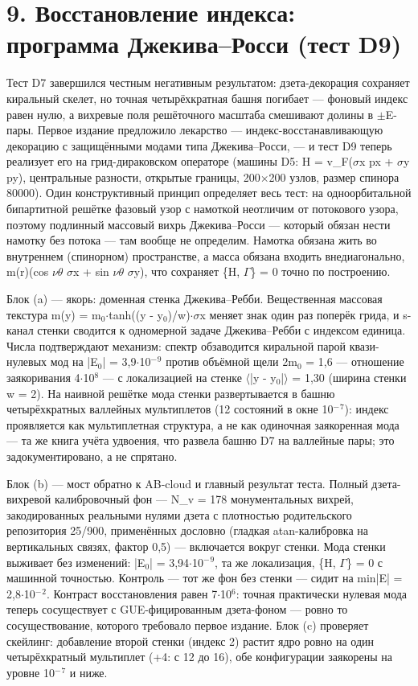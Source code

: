\documentclass[11pt,a4paper]{article}
\begin{document}
\section{9. Восстановление индекса: программа Джекива--Росси (тест D9)}
Тест D7 завершился честным негативным результатом: дзета-декорация сохраняет киральный скелет, но точная четырёхкратная башня погибает --- фоновый индекс равен нулю, а вихревые поля решёточного масштаба смешивают долины в $\pm$E-пары. Первое издание предложило лекарство --- индекс-восстанавливающую декорацию с защищёнными модами типа Джекива--Росси, --- и тест D9 теперь реализует его на грид-дираковском операторе (машины D5: H = v\_\allowbreak{}F($\sigma$x px + $\sigma$y py), центральные разности, открытые границы, 200$\times$200 узлов, размер спинора 80000). Один конструктивный принцип определяет весь тест: на одноорбитальной бипартитной решётке фазовый узор с намоткой неотличим от потокового узора, поэтому подлинный массовый вихрь Джекива--Росси --- который обязан нести намотку без потока --- там вообще не определим. Намотка обязана жить во внутреннем (спинорном) пространстве, а масса обязана входить внедиагонально, m(r)(cos $\nu$$\theta$ $\sigma$x + sin $\nu$$\theta$ $\sigma$y), что сохраняет \{H, $\Gamma$\} = 0 точно по построению.

Блок (a) --- якорь: доменная стенка Джекива--Ребби. Вещественная массовая текстура m(y) = m$_{0}$$\cdot$tanh((y - y$_{0}$)/w)$\cdot$$\sigma$x меняет знак один раз поперёк грида, и s-канал стенки сводится к одномерной задаче Джекива--Ребби с индексом единица. Числа подтверждают механизм: спектр обзаводится киральной парой квази-нулевых мод на |E$_{0}$| = 3,9$\cdot$10$^{-}$$^{9}$ против объёмной щели 2m$_{0}$ = 1,6 --- отношение заякоривания 4$\cdot$10$^{8}$ --- с локализацией на стенке $\langle$|y - y$_{0}$|$\rangle$ = 1,30 (ширина стенки w = 2). На наивной решётке мода стенки развертывается в башню четырёхкратных валлейных мультиплетов (12 состояний в окне 10$^{-}$$^{7}$): индекс проявляется как мультиплетная структура, а не как одиночная заякоренная мода --- та же книга учёта удвоения, что развела башню D7 на валлейные пары; это задокументировано, а не спрятано.

Блок (b) --- мост обратно к AB-cloud и главный результат теста. Полный дзета-вихревой калибровочный фон --- N\_\allowbreak{}v = 178 монументальных вихрей, закодированных реальными нулями дзета с плотностью родительского репозитория 25/900, применённых дословно (гладкая atan-калибровка на вертикальных связях, фактор 0,5) --- включается вокруг стенки. Мода стенки выживает без изменений: |E$_{0}$| = 3,94$\cdot$10$^{-}$$^{9}$, та же локализация, \{H, $\Gamma$\} = 0 с машинной точностью. Контроль --- тот же фон без стенки --- сидит на min|E| = 2,8$\cdot$10$^{-}$$^{2}$. Контраст восстановления равен 7$\cdot$10$^{6}$: точная практически нулевая мода теперь сосуществует с GUE-фицированным дзета-фоном --- ровно то сосуществование, которого требовало первое издание. Блок (c) проверяет скейлинг: добавление второй стенки (индекс 2) растит ядро ровно на один четырёхкратный мультиплет (+4: с 12 до 16), обе конфигурации заякорены на уровне 10$^{-}$$^{7}$ и ниже.
\end{document}
